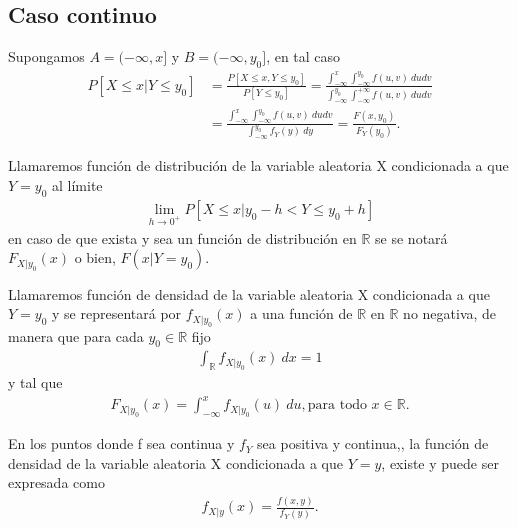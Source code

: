 \subsection{Caso continuo}
Supongamos $A = (-\infty,x]$ y $B = (-\infty,y_0]$, en tal caso
\begin{align*}
    P[X \leq x | Y \leq y_0] & = \frac{P[X \leq x , Y \leq y_0] }{P[Y \leq y_0]} = \frac{\int_{-\infty}^{x}{\int_{-\infty}^{y_0}{f(u,v) \ dudv}}}{\int_{-\infty}^{y_0}\int_{-\infty}^{+\infty}{f(u,v) \ dudv}} \\
                             & = \frac{\int_{-\infty}^{x}{\int_{-\infty}^{y_0}{f(u,v) \ dudv}}}{\int_{-\infty}^{y_0}{f_Y(y) \ dy}} = \frac{F(x,y_0)}{F_Y(y_0)}.
\end{align*}

\begin{defi}
    Llamaremos función de distribución de la variable aleatoria X condicionada a que $Y = y_0$ al límite
    \begin{align*}
        \lim_{h \to 0^+}{P[X \leq x | y_0 - h < Y \leq y_0 + h]}
    \end{align*}
    en caso de que exista y sea un función de distribución en $\mathbb{R}$ se se notará $F_{X | y_0}(x)$ o bien, $F(x | Y = y_0)$.
\end{defi}

\begin{defi}
    Llamaremos función de densidad de la variable aleatoria X condicionada a que $Y = y_0$ y se representará por $f_{X | y_0}(x)$ a una función de $\mathbb{R}$ en $\mathbb{R}$ no negativa, de manera que para cada $y_0 \in \mathbb{R}$ fijo
    \begin{align*}
        \int_{\mathbb{R}}{f_{X | y_0}(x) \ dx} = 1
    \end{align*}
    y tal que
    \begin{align*}
        F_{X | y_0}(x) = \int_{-\infty}^{x}{f_{X | y_0}(u) \ du}, \text{para todo } x \in \mathbb{R}.
    \end{align*}
\end{defi}

\begin{prop}
    En los puntos donde f sea continua y $f_Y$ sea positiva y continua,, la función de densidad de la variable aleatoria X condicionada a que $Y = y$, existe y puede ser expresada como
    \begin{align*}
        f_{X | y}(x) = \frac{f(x,y)}{f_Y(y)}.
    \end{align*}
\end{prop}

